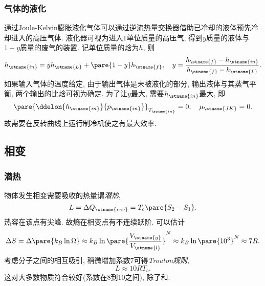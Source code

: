 \documentclass[../Thermal.tex]{subfiles}
\begin{document}
\subsubsection{气体的液化}
通过Joule-Kelvin膨胀液化气体可以通过逆流热量交换器借助已冷却的液体预先冷却进入的高压气体. 液化器可视为进入$1$单位质量的高压气, 得到$y$质量的液体与$1-y$质量的废气的装置. 记单位质量的焓为$h$, 则
\[ h_\stname{in} = yh_\stname{L} + \pare{1-y}h_\stname{f},\quad y = \frac{h_\stname{f}-h_\stname{in}}{h_\stname{f}-h_\stname{L}}. \]
如果输入气体的温度给定, 由于输出气体是未被液化的部分, 输出液体与其蒸气平衡, 两个输出的比焓可视为确定. 为了让$y$最大, 需要$h_\stname{in}$最大, 即
\[ \pare{\ddelon{h_\stname{in}}{p_\stname{in}}}_{T_\stname{in}} = 0,\quad \mu_\stname{JK} = 0. \]
故需要在反转曲线上运行制冷机使之有最大效率.
\subsection{相变}
\subsubsection{潜热}
物体发生相变需要吸收的热量谓\emph{潜热},
\[ L = \Delta Q_\stname{rev} = T_c\pare{S_2 - S_1}. \]
热容在该点有尖峰. 故熵在相变点有不连续跃阶. 可以估计
\[ \Delta S = \Delta\pare{k_B\ln\Omega} \approx k_B\ln\pare{\frac{V_\stname{g}}{V_\stname{l}}}^N \approx k_B\ln \pare{10^3}^N\approx 7R. \]
考虑分子之间的相互吸引, 稍微增加系数$7$可得\emph{Trouton规则},
\[ L \approx 10RT_b. \]
这对大多数物质符合较好(系数在$8$到$10$之间), 除了和.
\end{document}
